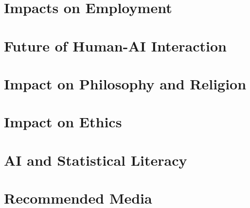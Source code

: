 \documentclass[10pt]{beamer}
\begin{document}
  \section{Impacts on Employment}
  \section{Future of Human-AI Interaction}
  \section{Impact on Philosophy and Religion}
  \section{Impact on Ethics}
  \section{AI and Statistical Literacy}
  \section{Recommended Media}
  
\end{document}
